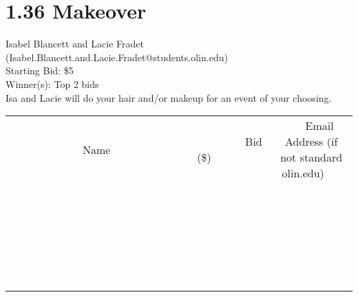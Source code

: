 \documentclass[11pt]{article}
\begin{document}
\section*{1.36 Makeover}
Isabel Blancett and Lacie Fradet (Isabel.Blancett.and.Lacie.Fradet@students.olin.edu) \\
Starting Bid: \$5 \\
Winner(s): 
Top 2 bids \\
Isa and Lacie will do your hair and/or makeup for an event of your choosing. \\[6ex]
\begin{tabular}{c c c}
~~~~~~~~~~~~~Name~~~~~~~~~~~~~ & ~~~~~~~~~Bid (\$)~~~~~~~~~ & ~~~Email Address (if not standard olin.edu)~~~ \\
 & & \\
\hline
 & & \\
\hline
 & & \\
\hline
 & & \\
\hline
 & & \\
\hline
 & & \\
\hline
 & & \\
\hline
 & & \\
\hline
 & & \\
\hline
 & & \\
\hline
 & & \\
\hline
 & & \\
\hline
 & & \\
\hline
 & & \\
\hline
 & & \\
\hline
 & & \\
\hline
 & & \\
\hline
 & & \\
\hline
 & & \\
\hline
 & & \\
\hline
 & & \\
\hline
 & & \\
\hline
 & & \\
\hline
 & & \\
\hline
 & & \\
\hline
 & & \\
\hline
\end{tabular}
\clearpage
\end{document}
